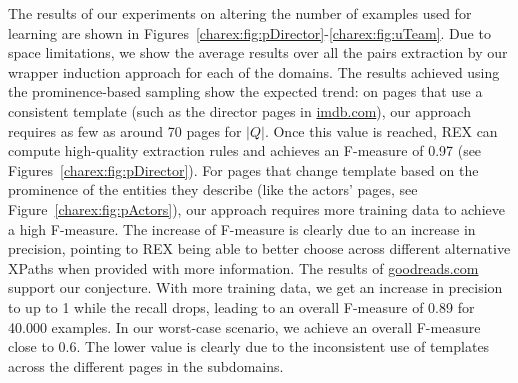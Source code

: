 The results of our experiments on altering the number of examples used for learning are shown in Figures~\ref{charex:fig:pDirector}-\ref{charex:fig:uTeam}. 
Due to space limitations, we show the average results over all the pairs extraction by our wrapper induction approach for each of the domains.
The results achieved using the prominence-based sampling show the expected trend: on pages that use a consistent template (such as the director pages in \url{imdb.com}), our approach requires as few as around 70 pages for $|Q|$. 
Once this value is reached, REX can compute high-quality extraction rules and achieves an F-measure of 0.97 (see Figures~\ref{charex:fig:pDirector}).
For pages that change template based on the prominence of the entities they describe (like the actors' pages, see Figure~\ref{charex:fig:pActors}), our approach requires more training data to achieve a high F-measure.
The increase of F-measure is clearly due to an increase in precision, pointing to REX being able to better choose across different alternative XPaths when provided with more information.
The results of \url{goodreads.com} support our conjecture. 
With more training data, we get an increase in precision to up to 1 while the recall drops, leading to an overall F-measure of 0.89 for 40.000 examples.
In our worst-case scenario, we achieve an overall F-measure close to 0.6.
The lower value is clearly due to the inconsistent use of templates across the different pages in the subdomains.


